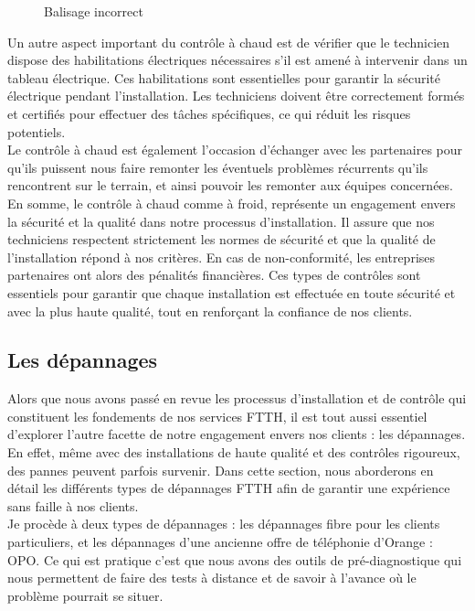 \documentclass[12pt, a4paper]{article}
\begin{document}
\begin{figure}[htbp]
\begin{minipage}[b]{0.4\textwidth}
      \caption{Balisage incorrect}
    \end{minipage}
\end{figure}

Un autre aspect important du contrôle à chaud est
de vérifier que le technicien dispose des
habilitations électriques nécessaires s'il
est amené à intervenir dans un tableau
électrique. Ces habilitations sont essentielles
pour garantir la sécurité électrique pendant
l'installation. Les techniciens doivent être
correctement formés et certifiés pour effectuer
des tâches spécifiques, ce qui réduit les
risques potentiels.\\

Le contrôle à chaud est également l'occasion
d'échanger avec les partenaires pour qu'ils 
puissent nous faire remonter les éventuels
problèmes récurrents qu'ils rencontrent sur le terrain, 
et ainsi pouvoir les remonter aux équipes concernées.\\

En somme, le contrôle à chaud comme à froid,
représente un engagement envers la sécurité et la qualité
dans notre processus d'installation. Il assure
que nos techniciens respectent strictement
les normes de sécurité et que la qualité de
l'installation répond à nos critères.
En cas de non-conformité, les entreprises 
partenaires ont alors des pénalités financières.
Ces types de contrôles sont essentiels pour garantir
que chaque installation est
effectuée en toute sécurité et avec la plus
haute qualité, tout en renforçant la confiance
de nos clients.


\newpage
\subsection{Les dépannages}
Alors que nous avons passé en revue les processus d'installation et
de contrôle qui constituent les fondements de nos services \gls{FTTH},
il est tout aussi essentiel d'explorer l'autre
facette de notre engagement envers nos clients : les dépannages.
En effet, même avec des installations de haute qualité et des
contrôles rigoureux, des pannes peuvent parfois survenir.
Dans cette section, nous aborderons en détail
les différents types de dépannages \gls{FTTH} afin de garantir une expérience sans
faille à nos clients.\\

Je procède à deux types de dépannages : les dépannages fibre pour les 
clients particuliers, et les dépannages d'une ancienne offre de téléphonie 
d'Orange : \gls{OPO}. Ce qui est pratique c'est que nous 
avons des outils de pré-diagnostique qui nous permettent de faire des tests
à distance et de savoir à l'avance où le problème pourrait se situer.
\end{document}
